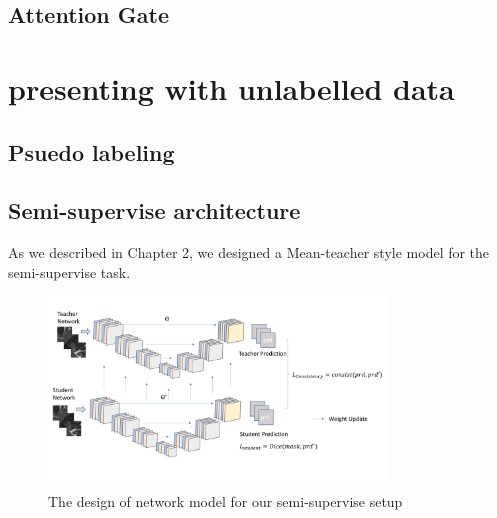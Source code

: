 \subsection{Attention Gate}
\section{presenting with unlabelled data}
\subsection{Psuedo labeling}
\subsection{Semi-supervise architecture}
As we described in Chapter 2, we designed a Mean-teacher style model for the semi-supervise task.
\begin{figure}
	\centering
	\includegraphics[width=0.8\textwidth]{img/Networks/mean-teacher-net}
	\caption{The design of network model for our semi-supervise setup}
\end{figure}